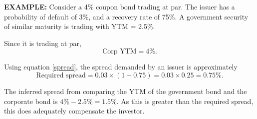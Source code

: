 \documentclass[../notes_compiled.tex]{subfiles}
\begin{document}
\begin{itemize}
{\color{RedViolet}
\item[] \textbf{EXAMPLE:} Consider a 4\% coupon bond trading at par. The issuer has a probability of default of 3\%, and a recovery rate of 75\%. A government security of similar maturity is trading with YTM = 2.5\%.
}


{\color{RoyalBlue}
Since it is trading at par,
\begin{equation*}
\text{Corp YTM} = 4\%.
\end{equation*}

Using equation \ref{spread}, the spread demanded by an issuer is approximately
\begin{equation*}
\text{Required spread} = 0.03\times(1-0.75) = 0.03\times0.25 = 0.75\%.
\end{equation*}

The inferred spread from comparing the YTM of the government bond and the corporate bond is $4\%-2.5\%=1.5\%$. As this is greater than the required spread, this does adequately compensate the investor.
}
\end{itemize}
\end{document}
